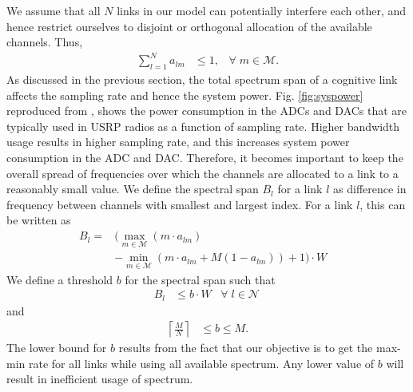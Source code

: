 \documentclass[conference]{IEEEtran}
\begin{document}
We assume that all $N$ links in our model can potentially interfere each other, and hence restrict ourselves to disjoint or orthogonal allocation of the available channels. Thus,
\begin{align}
  \sum_{l=1}^N a_{lm} &\leq 1,\;\;\; \forall\; m \in \mathcal{M}. \end{align}
As discussed in the previous section, the total spectrum span of a cognitive link affects the sampling rate and hence the system power. Fig. \ref{fig:syspower} reproduced from  \cite{Nazmul_NCOFDM1}, shows the power consumption in the ADCs and  DACs that are typically used in USRP radios as a function of sampling rate. Higher bandwidth usage results in higher sampling rate, and this  increases system power consumption in the ADC and DAC. Therefore, it becomes important to keep the overall spread of frequencies over which the channels are allocated to a link to a reasonably small value. We define the spectral span $B_l$ for a link $l$ as difference in frequency between channels with smallest and largest index. For a link $l$, this can be written as
\begin{align}
  B_l=&\Big(\max_{m \in \mathcal{M}}(m\cdot a_{lm})\nonumber\\ 
  &- \min_{m \in \mathcal{M}}(m\cdot a_{lm}+M(1-a_{lm}))+1\Big)\cdot W\;\;\;  \end{align}
We define a  threshold $b$ for the spectral span such that
\begin{align}
  B_l&\leq b\cdot W\;\;\; \forall\; l \in \mathcal{N}\, \end{align}
and
\begin{align}
    \left\lceil \frac{M}{N}\right\rceil &\leq b \leq  M.\end{align}
The lower bound for $b$ results from the fact that our objective is to get the max-min rate for all links while using all available spectrum. Any lower value of $b$ will result in inefficient usage of spectrum.
\end{document}
